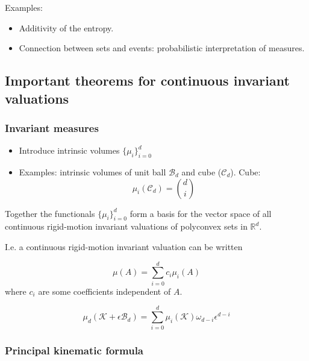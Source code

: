 Examples:
\begin{itemize}
\item Additivity of the entropy.
\item Connection between sets and events: probabilistic interpretation of measures.
\end{itemize}

\subsection{Important theorems for continuous invariant valuations}

\subsubsection{Invariant measures}

\begin{itemize}
\item Introduce intrinsic volumes $\{\mu_i\}_{i=0}^d$
\item Examples: intrinsic volumes of unit ball $\mathcal{B}_d$ and cube ($\mathcal{C}_d$). Cube:
  \begin{equation}
    \mu_i (\mathcal{C}_d) = {d \choose i}
  \end{equation}
\end{itemize}

\begin{theorem}
  Together the functionals $\{\mu_i\}_{i=0}^d$ form a basis for the vector space of all continuous rigid-motion invariant valuations of polyconvex sets in $\mathbb{R}^d$.
\end{theorem}

I.e. a continuous rigid-motion invariant valuation can be written

\begin{equation}
  \mu(A) = \sum_{i=0}^d c_i \mu_i(A)
\end{equation}
where $c_i$ are some coefficients independent of $A$.

\begin{theorem}
  \begin{equation}
    \mu_d(\mathcal{K} + \epsilon \mathcal{B}_d) =
    \sum_{i=0}^d \mu_i(\mathcal{K}) \omega_{d-i} \epsilon^{d-i}
  \end{equation}
\end{theorem}

\subsubsection{Principal kinematic formula}

